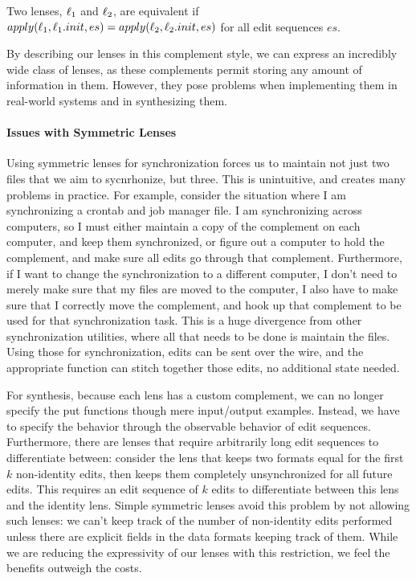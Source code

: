 \documentclass[acmsmall,screen,anonymous]{acmart}
\begin{document}
Two lenses, $\mathit{\ell}_1$ and $\mathit{\ell}_2$, are equivalent if
$apply(\mathit{\ell}_1,\mathit{\ell}_1.init,es) = apply(\mathit{\ell}_2,\mathit{\ell}_2.init,es)$ for all edit
sequences $es$.

By describing our lenses in this complement style, we can express an incredibly
wide class of lenses, as these complements permit storing any amount of
information in them.  However, they pose problems when implementing them in
real-world systems and in synthesizing them.

\paragraph*{Issues with Symmetric Lenses} Using symmetric lenses for
synchronization forces us to maintain not just two files that we aim to
sycnrhonize, but three. This is unintuitive, and creates many problems in 
practice. For example, consider the situation where I am synchronizing a crontab
and job manager file. I am synchronizing across computers, so I must either
maintain a copy of the complement on each computer, and keep them synchronized,
or figure out a computer to hold the complement, and make sure all edits go
through that complement. Furthermore, if I want to change the synchronization to
a different computer, I don't need to merely make sure that my files are moved
to the computer, I also have to make sure that I correctly move the complement,
and hook up that complement to be used for that synchronization task. This is a
huge divergence from other synchronization utilities, where all
that needs to be 
done is maintain the files. Using those for synchronization, edits can be sent
over the wire, and the appropriate function can stitch together those edits, no
additional state needed.

For synthesis, because each lens has a custom complement, we can no longer
specify the put functions though mere input/output examples.  Instead, we have
to specify the behavior through the observable behavior of edit sequences.
Furthermore, there are lenses that require arbitrarily long edit sequences to
differentiate between: consider the lens that keeps two formats equal for the
first $k$ non-identity edits, then keeps them completely unsynchronized for all
future edits.  This requires an edit sequence of $k$ edits to differentiate
between this lens and the identity lens.  Simple symmetric lenses avoid this
problem by not allowing such lenses: we can't keep track of the number of
non-identity edits performed unless there are explicit fields in the data
formats keeping track of them.  While we are reducing the expressivity of our
lenses with this restriction, we feel the benefits outweigh the costs.
\end{document}
